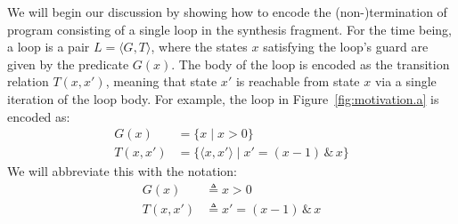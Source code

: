 \documentclass[preprint]{sigplanconf}
\theoremstyle{definition}
\begin{document}
We will begin our discussion by showing how to encode the (non-)termination of program consisting of a single loop 
in the synthesis fragment.  For the time being, a loop is a pair ${L= \langle G,T \rangle}$,
where the states $x$ satisfying the loop's guard are given by the predicate $G(x)$.
The body of the loop is encoded as the transition relation $T(x, x')$, meaning that
state $x'$ is reachable from state $x$ via a single iteration of the loop body.
For example, the loop in Figure~\ref{fig:motivation.a} is encoded as:
\begin{align*}
G(x) & = \{ x \mid x>0 \} \\
T(x,x') &= \{ \langle x, x' \rangle \mid x' = (x - 1) \, \& \, x \}
\end{align*}
We will abbreviate this with the notation:
\begin{align*}
G(x) & \triangleq x > 0 \\
T(x, x') & \triangleq x' = (x - 1) \, \& \, x
\end{align*}
\end{document}
